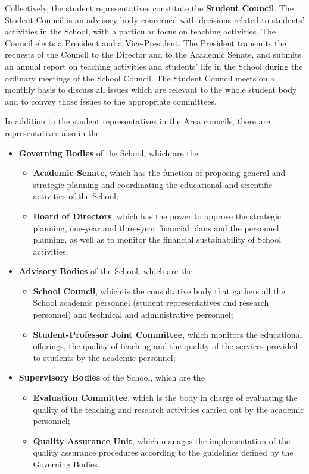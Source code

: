 \documentclass{sissavademecum}
\begin{document}
Collectively, the student representatives constitute the \textbf{Student Council}. The Student Council is an advisory body concerned with decisions related to students' activities in the School, with a particular focus on teaching activities. The Council elects a President and a Vice-President. The President transmits the requests of the Council to the Director and to the Academic Senate, and submits an annual report on teaching activities and students' life in the School during the ordinary meetings of the School Council. The Student Council meets on a monthly basis to discuss all issues which are relevant to the whole student body and to convey those issues to the appropriate committees.

In addition to the student representatives in the Area councils, there are representatives also in the
\begin{itemize}
	\item \textbf{Governing Bodies} of the School, which are the
	\begin{itemize}
		\item \textbf{Academic Senate}, which has the function of proposing general and strategic planning and coordinating the educational and scientific activities of the School;
		\item \textbf{Board of Directors}, which has the power to approve the strategic planning, one-year and three-year financial plans and the personnel planning, as well as to monitor the financial sustainability of School activities;
	\end{itemize}
	\item \textbf{Advisory Bodies} of the School, which are the
	\begin{itemize}
		\item \textbf{School Council}, which is the consultative body that gathers all the School academic personnel (student representatives and research personnel) and technical and administrative personnel;
		\item \textbf{Student-Professor Joint Committee}, which monitors the educational offerings, the quality of teaching and the quality of the services provided to students by the academic personnel;
	\end{itemize}
	\item \textbf{Supervisory Bodies} of the School, which are the
	\begin{itemize}
		\item \textbf{Evaluation Committee}, which is the body in charge of evaluating the quality of the teaching and research activities carried out by the academic personnel;
		\item \textbf{Quality Assurance Unit}, which manages the implementation of the quality assurance procedures according to the guidelines defined by the Governing Bodies.
	\end{itemize}
\end{itemize}
\end{document}
